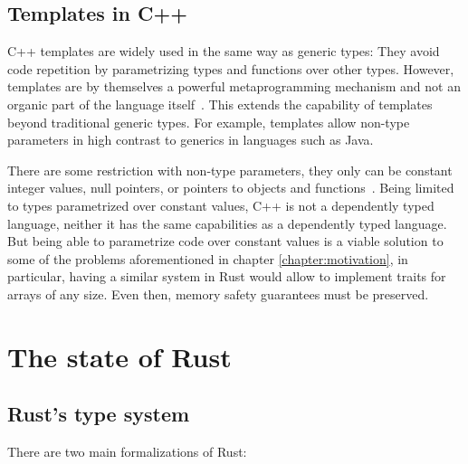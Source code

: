 \subsection{Templates in C++} 

C++ templates are widely used in the same way as generic types: They avoid code
repetition by parametrizing types and functions over other types. However,
templates are by themselves a powerful metaprogramming mechanism and not an
organic part of the language itself~\cite{template_metaprogramming}. This
extends the capability of templates beyond traditional generic types. For
example, templates allow non-type parameters in high contrast to generics in
languages such as Java.

There are some restriction with non-type parameters, they only can be constant
integer values, null pointers, or pointers to objects and
functions~\cite{templates}. Being limited to types parametrized over constant
values, C++ is not a dependently typed language, neither it has the same
capabilities as a dependently typed language. But being able to parametrize code
over constant values is a viable solution to some of the problems aforementioned
in chapter \ref{chapter:motivation}, in particular, having a similar system in
Rust would allow to implement traits for arrays of any size. Even then, memory
safety guarantees must be preserved.

\section{The state of Rust} 

\subsection{Rust's type system}

There are two main formalizations of Rust: 

